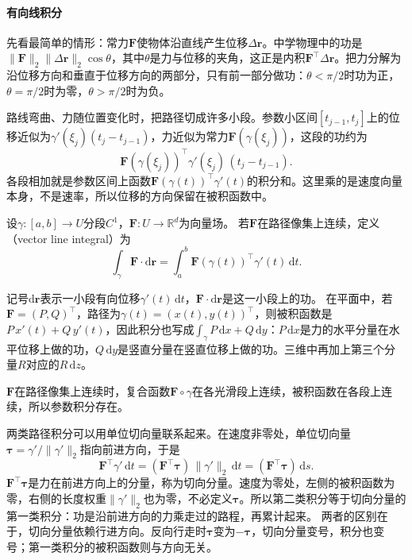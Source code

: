 \paragraph{有向线积分}

先看最简单的情形：常力$\bm F$使物体沿直线产生位移$\Delta\bm r$。中学物理中的功是$\lVert\bm F\rVert_2\lVert\Delta\bm r\rVert_2\cos\theta$，其中$\theta$是力与位移的夹角，这正是内积$\bm F^\top\Delta\bm r$。把力分解为沿位移方向和垂直于位移方向的两部分，只有前一部分做功：$\theta<\pi/2$时功为正，$\theta=\pi/2$时为零，$\theta>\pi/2$时为负。

路线弯曲、力随位置变化时，把路径切成许多小段。参数小区间$[t_{j-1},t_j]$上的位移近似为$\gamma'(\xi_j)(t_j-t_{j-1})$，力近似为常力$\bm F(\gamma(\xi_j))$，这段的功约为
\[
 \bm F(\gamma(\xi_j))^\top\gamma'(\xi_j)\,(t_j-t_{j-1}).
\]
各段相加就是参数区间上函数$\bm F(\gamma(t))^\top\gamma'(t)$的积分和。这里乘的是速度向量本身，不是速率，所以位移的方向保留在被积函数中。
\begin{definition}[第二类路径积分]
设$\gamma:[a,b]\to U$分段$C^1$，$\bm F:U\to\mathbb R^d$为向量场。
若$\bm F$在路径像集上连续，定义（vector line integral）为
\begin{equation}
 \int_\gamma\bm F\mathbin{\cdot}\mathrm d\bm r
 =\int_a^b\bm F(\gamma(t))^\top\gamma'(t)\,\mathrm dt.
 \label{eq:analysis-vector-line-integral}
\end{equation}
\end{definition}

记号$\mathrm d\bm r$表示一小段有向位移$\gamma'(t)\,\mathrm dt$，$\bm F\cdot\mathrm d\bm r$是这一小段上的功。
在平面中，若$\bm F=(P,Q)^\top$，路径为$\gamma(t)=(x(t),y(t))^\top$，则被积函数是$P\,x'(t)+Q\,y'(t)$，因此积分也写成$\int_\gamma P\,\mathrm dx+Q\,\mathrm dy$：$P\,\mathrm dx$是力的水平分量在水平位移上做的功，$Q\,\mathrm dy$是竖直分量在竖直位移上做的功。三维中再加上第三个分量$R$对应的$R\,\mathrm dz$。

$\bm F$在路径像集上连续时，复合函数$\bm F\circ\gamma$在各光滑段上连续，被积函数在各段上连续，所以参数积分存在。

两类路径积分可以用单位切向量联系起来。在速度非零处，单位切向量$\bm\tau=\gamma'/\lVert\gamma'\rVert_2$指向前进方向，于是
\[
 \bm F^\top\gamma'\,\mathrm dt=(\bm F^\top\bm\tau)\,\lVert\gamma'\rVert_2\,\mathrm dt=(\bm F^\top\bm\tau)\,\mathrm ds.
\]
$\bm F^\top\bm\tau$是力在前进方向上的分量，称为切向分量。速度为零处，左侧的被积函数为零，右侧的长度权重$\lVert\gamma'\rVert_2$也为零，不必定义$\bm\tau$。所以第二类积分等于切向分量的第一类积分：功是沿前进方向的力乘走过的路程，再累计起来。
两者的区别在于，切向分量依赖行进方向。反向行走时$\bm\tau$变为$-\bm\tau$，切向分量变号，积分也变号；第一类积分的被积函数则与方向无关。

